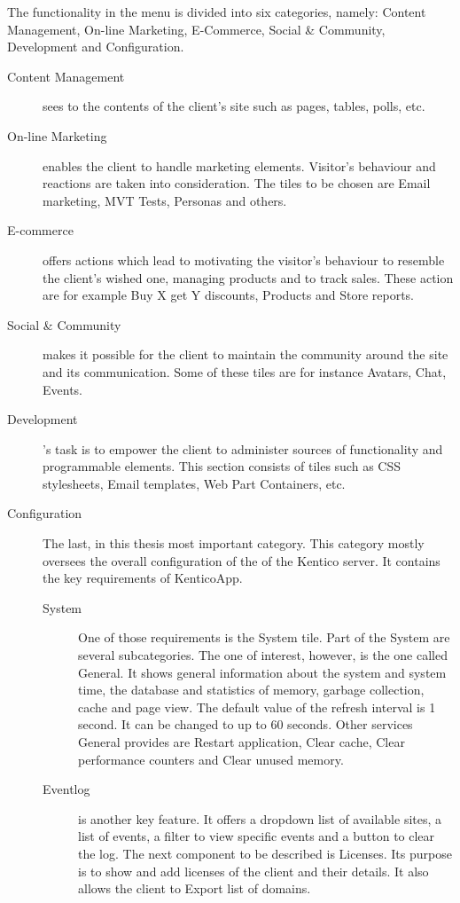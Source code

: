 The functionality in the menu is divided into six categories, namely: Content Management, On-line Marketing, E-Commerce, Social \& Community, Development and Configuration. 
\begin{description}
\item [Content Management] sees to the contents of the client's site such as pages, tables, polls, etc. 
\item [On-line Marketing] enables the client to handle marketing elements. Visitor's behaviour and reactions are taken into consideration. The tiles to be chosen are Email marketing, MVT Tests, Personas and others. 
\item [E-commerce] offers actions which lead to motivating the visitor's behaviour to resemble the client's wished one, managing products and to track sales. These action are for example Buy X get Y discounts, Products and Store reports. 
\item [Social \& Community] makes it possible for the client to maintain the community around the site and its communication. Some of these tiles are for instance Avatars, Chat, Events. 
\item [Development]'s task is to empower the client to administer sources of functionality and programmable elements. This section consists of tiles such as CSS stylesheets, Email templates, Web Part Containers, etc. 
\item [Configuration] The last, in this thesis most important category. This category mostly oversees the overall configuration of the of the Kentico server. It contains the key requirements of KenticoApp.
	\begin {description}
	\item [System] One of those requirements is the System tile. Part of the System are several subcategories. The one of interest, however, is the one called General. It shows general information about the system and system time, the database and statistics of memory, garbage collection, cache and page view. The default value of the refresh interval is 1 second. It can be changed to up to 60 seconds. Other services General provides are Restart application, Clear cache, Clear performance counters and Clear unused memory. 
	\item [Eventlog] is another key feature. It offers a dropdown list of available sites, a list of events, a filter to view specific events and a button to clear the log. 
	The next component to be described is Licenses. Its purpose is to show and add licenses of the client and their details. It also allows the client to Export list of domains. 

\end{description}
\end{description}
